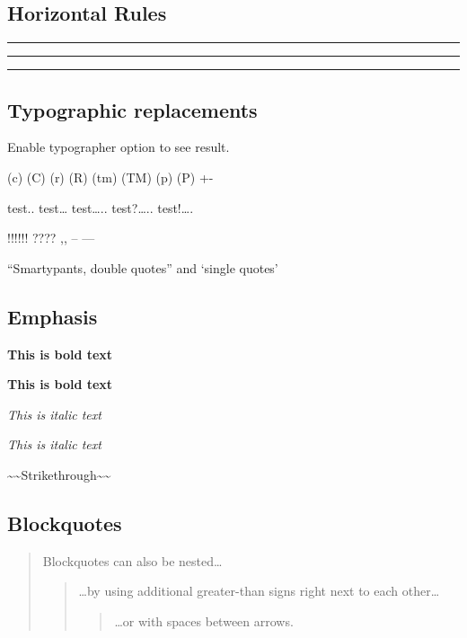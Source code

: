 \documentclass[]{article}
\begin{document}
\subsection{Horizontal Rules}

\begin{center}\rule{0.5\linewidth}{\linethickness}\end{center}

\begin{center}\rule{0.5\linewidth}{\linethickness}\end{center}

\begin{center}\rule{0.5\linewidth}{\linethickness}\end{center}

\subsection{Typographic replacements}

Enable typographer option to see result.

(c) (C) (r) (R) (tm) (TM) (p) (P) +-

test.. test\ldots{} test\ldots{}.. test?\ldots{}.. test!\ldots{}.

!!!!!! ???? ,, -- ---

``Smartypants, double quotes'' and `single quotes'

\subsection{Emphasis}

\textbf{This is bold text}

\textbf{This is bold text}

\emph{This is italic text}

\emph{This is italic text}

\textasciitilde{}\textasciitilde{}Strikethrough\textasciitilde{}\textasciitilde{}

\subsection{Blockquotes}

\begin{quote}
Blockquotes can also be nested\ldots{}

\begin{quote}
\ldots{}by using additional greater-than signs right next to each
other\ldots{}

\begin{quote}
\ldots{}or with spaces between arrows.
\end{quote}
\end{quote}
\end{quote}
\end{document}
